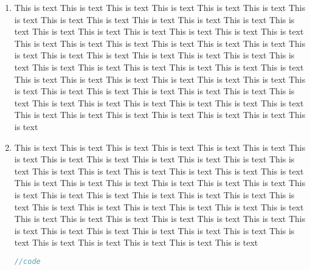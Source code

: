\documentclass[a4paper]{uestcreport}
\begin{document}
\begin{enumerate}
    \item This is text This is text This is text This is text This is text This is text This is text This is text This is text This is text This is text This is text This is text This is text This is text This is text This is text This is text This is text This is text This is text This is text This is text This is text This is text This is text This is text This is text This is text This is text This is text This is text This is text This is text This is text This is text This is text This is text This is text This is text This is text This is text This is text This is text This is text This is text This is text This is text This is text This is text This is text This is text This is text This is text This is text This is text This is text This is text This is text This is text This is text This is text This is text This is text 
    \item This is text This is text This is text This is text This is text This is text This is text This is text This is text This is text This is text This is text This is text This is text This is text This is text This is text This is text This is text This is text This is text This is text This is text This is text This is text This is text This is text This is text This is text This is text This is text This is text This is text This is text This is text This is text This is text This is text This is text This is text This is text This is text This is text This is text This is text This is text This is text This is text This is text This is text This is text This is text This is text This is text This is text This is text 
          \begin{lstlisting}[language=C++]
//code    
    \end{lstlisting}
\end{enumerate}
\end{document}
